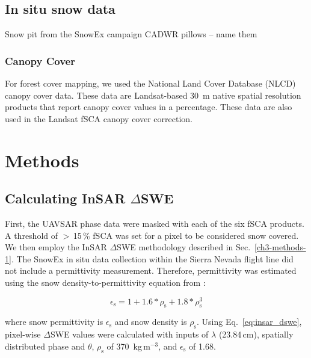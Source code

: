 \hypertarget{ch4-methods-8}{\subsection{In situ snow data}\label{ch4-methods-8}}

Snow pit from the SnowEx campaign
CADWR pillows -- name them

\hypertarget{ch4-methods-9}{\subsubsection{Canopy Cover}\label{ch4-methods-9}}

For forest cover mapping, we used the National Land Cover Database (NLCD) \citep{homerConterminousUnitedStates2020} canopy cover data. These data are Landsat-based 30~m native spatial resolution products that report canopy cover values in a percentage. These data are also used in the Landsat fSCA canopy cover correction.

\hypertarget{ch4-methods}{\section{Methods}\label{ch4-methods}}
\hypertarget{ch4-methods-1}{\subsection{Calculating InSAR $\Delta$SWE}\label{ch4-methods-1}}

First, the UAVSAR phase data were masked with each of the six fSCA products. A threshold of $>$\,15\,\% fSCA was set for a pixel to be considered snow covered. We then employ the InSAR $\Delta$SWE methodology described in Sec.~\ref{ch3-methods-1}. The SnowEx in situ data collection within the Sierra Nevada flight line did not include a permittivity measurement. Therefore, permittivity was estimated using the snow density-to-permittivity equation from \cite{guneriussenInSAREstimationChanges2001}:

\begin{equation}
\epsilon_\mathrm{s} = 1 + 1.6 * \rho_\mathrm{s} + 1.8 * \rho_\mathrm{s}^3
\label{eq:dens_to_perm}
\end{equation}

\noindent where snow permittivity is $\epsilon_\mathrm{s}$ and snow density is $\rho_\mathrm{s}$. Using Eq.~\ref{eq:insar_dswe}, pixel-wise $\Delta$SWE values were calculated with inputs of $\lambda$ (23.84\,cm), spatially distributed phase and $\theta$, $\rho_\mathrm{s}$ of 370~kg\,m$^{-3}$, and $\epsilon_\mathrm{s}$ of 1.68. 

